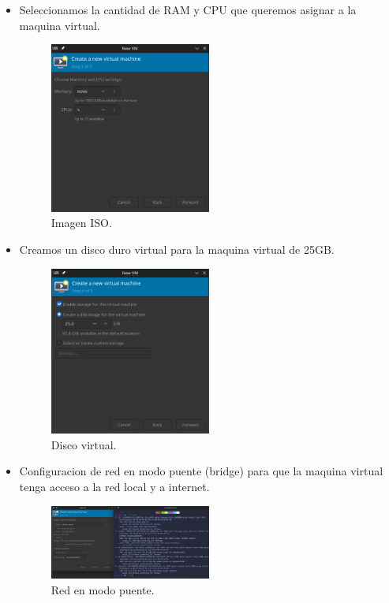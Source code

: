 \documentclass[a4paper,12pt]{article}
\begin{document}
\begin{itemize}
        \item Seleccionamos la cantidad de RAM y CPU que queremos asignar a la maquina virtual.
        
        
        \begin{figure}[h!]
            \centering
            \includegraphics[width=0.5\textwidth]{5.png}
            \caption{Imagen ISO.}

        \end{figure}

        \item Creamos un disco duro virtual para la maquina virtual de 25GB.
        
        \begin{figure}[h!]
            \centering
            \includegraphics[width=0.5\textwidth]{6.png}
            \caption{Disco virtual.}
        \end{figure}
    
        \item Configuracion de red en modo puente (bridge) para que la maquina virtual tenga acceso a la red local y a internet.
    
        \begin{figure}[h!]
            \centering
            \includegraphics[width=0.5\textwidth]{7.png}
            \caption{Red en modo puente.}
        \end{figure}


\end{itemize}
\end{document}
